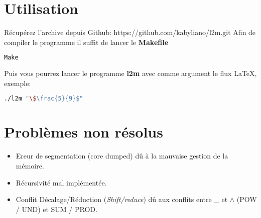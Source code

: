 \documentclass[12pt,a4paper]{article}
\begin{document}
\section{Utilisation}

Récupérez l'archive depuis Github: https://github.com/kabyliano/l2m.git
Afin de compiler le programme il suffit de lancer le \textbf{Makefile}

\begin{lstlisting}[language=Bash]
Make
\end{lstlisting}
Puis vous pourrez lancer le programme \textbf{l2m} avec comme argument le flux \LaTeX, exemple:

\begin{lstlisting}[language=Bash]
./l2m "\$\frac{5}{9}$"
\end{lstlisting}

\section{Problèmes non résolus}
\begin{itemize}
	\item Ereur de segmentation (core dumped) dû à la mauvaise gestion de la mémoire.
	\item Récursivité mal implémentée.
	\item Conflit Décalage/Réduction (\textit{Shift/reduce}) dû aux conflits entre \_ et $\wedge$ (POW / UND) et SUM / PROD.
\end{itemize}

	
\end{document}
